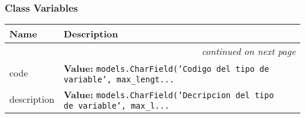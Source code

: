   \subsubsection{Class Variables}

    \vspace{-1cm}
\hspace{\varindent}\begin{longtable}{|p{\varnamewidth}|p{\vardescrwidth}|l}
\cline{1-2}
\cline{1-2} \centering \textbf{Name} & \centering \textbf{Description}& \\
\cline{1-2}
\endhead\cline{1-2}\multicolumn{3}{r}{\small\textit{continued on next page}}\\\endfoot\cline{1-2}
\endlastfoot\raggedright c\-o\-d\-e\- & \raggedright \textbf{Value:} 
{\tt models.CharField('Codigo del tipo de variable', max\_lengt\texttt{...}}&\\
\cline{1-2}
\raggedright d\-e\-s\-c\-r\-i\-p\-t\-i\-o\-n\- & \raggedright \textbf{Value:} 
{\tt models.CharField('Decripcion del tipo de variable', max\_l\texttt{...}}&\\
\cline{1-2}
\end{longtable}

